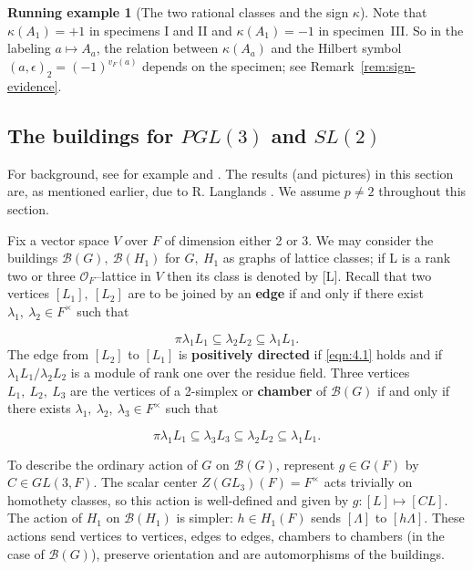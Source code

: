 \documentclass[12pt,letterpaper]{amsart}
\numberwithin{equation}{section}
\theoremstyle{definition}
\newtheorem{runex}[theorem]{Running example}
\theoremstyle{plain}
\providecommand{\cal}{\mathcal}
\def\bbb{{\cal B}}
\def\off{{\cal O}_F}
\def\bbg{{\cal B}(G)}
\def\bbH1{{\cal B}(H_1)}
\def\sne{\subseteq}
\begin{document}
\begin{runex}[The two rational classes and the sign $\kappa$]
Note that $\kappa(A_1)=+1$ in specimens I and II and
$\kappa(A_1)=-1$ in specimen~III. So in the labeling $a\mapsto A_a$,
the relation between $\kappa(A_a)$ and the Hilbert symbol
$(a,\epsilon)_2=(-1)^{v_F(a)}$ depends on the specimen; see
Remark~\ref{rem:sign-evidence}.
\end{runex}

\subsection{The buildings for $PGL(3)$ and $SL(2)$}
\label{sec:4}

For background, see for example \cite{Ko80} and \cite{Ti79}.
The results (and pictures) in this section are, as 
mentioned earlier, due to R. Langlands
\cite{LaUn}. We assume $p\not= 2$ throughout this section.
 
Fix a vector space $V$ over $F$ of dimension either 2 or 3.
We may consider the buildings $\bbb (G),\ \bbb (H_1)$ for $G,\ H_1$
as graphs of lattice classes; if L is a rank two or three $\off$--lattice
in $V$
then its class is denoted by [L]. Recall that two vertices $[L_1],\ [L_2]$
are to be joined by an {\bf edge} if and only if there exist 
$\lambda_1,\ \lambda_2 \in F^{\times}$ such that

\begin{equation}
\label{eqn:4.1}
\pi\lambda_1 L_1 \sne \lambda_2 L_2 \sne \lambda_1 L_1.
\end{equation}
The edge from $[L_2]$ to $[L_1]$ is {\bf positively directed} if \eqref{eqn:4.1}
holds and if $\lambda_1 L_1/\lambda_2 L_2$ is a module of rank one
over the residue field.
Three vertices $L_1,\ L_2,\ L_3$ are the vertices of a 2-simplex
or {\bf chamber} of $\bbb (G)$ if and only if there exists
$\lambda_1,\ \lambda_2,\ \lambda_3 \in F^{\times}$ such that

\begin{equation}
\label{eqn:4.2}
\pi\lambda_1 L_1 \sne \lambda_3L_3 
\sne \lambda_2 L_2 \sne \lambda_1 L_1.
\end{equation}
 
To describe the ordinary action of $G$ on
$\bbg$, represent $g\in G(F)$ by $C\in GL(3,F)$.
The scalar center $Z(GL_3)(F)=F^\times$ acts trivially on
homothety classes, so this action is well-defined and given by
$g:[L]\mapsto[CL]$.
The action of $H_1$ on $\bbH1$ is simpler: $h\in H_1(F)$ sends
$[\Lambda ]$ to $[h\Lambda ]$. These actions send vertices to vertices, 
edges to edges, chambers to chambers
(in the case of $\bbg$), preserve orientation and are
automorphisms of the buildings. 
 
\end{document}
